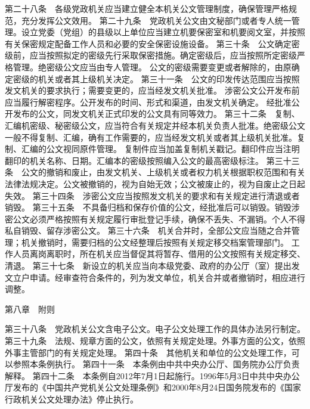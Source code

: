 \documentclass{gbt9704}
\begin{document}
第二十八条　各级党政机关应当建立健全本机关公文管理制度，确保管理严格规范，充分发挥公文效用。
第二十九条　党政机关公文由文秘部门或者专人统一管理。设立党委（党组）的县级以上单位应当建立机要保密室和机要阅文室，并按照有关保密规定配备工作人员和必要的安全保密设施设备。
第三十条　公文确定密级前，应当按照拟定的密级先行采取保密措施。确定密级后，应当按照所定密级严格管理。绝密级公文应当由专人管理。
公文的密级需要变更或者解除的，由原确定密级的机关或者其上级机关决定。
第三十一条　公文的印发传达范围应当按照发文机关的要求执行；需要变更的，应当经发文机关批准。
涉密公文公开发布前应当履行解密程序。公开发布的时间、形式和渠道，由发文机关确定。
经批准公开发布的公文，同发文机关正式印发的公文具有同等效力。
第三十二条　复制、汇编机密级、秘密级公文，应当符合有关规定并经本机关负责人批准。绝密级公文一般不得复制、汇编，确有工作需要的，应当经发文机关或者其上级机关批准。复制、汇编的公文视同原件管理。
复制件应当加盖复制机关戳记。翻印件应当注明翻印的机关名称、日期。汇编本的密级按照编入公文的最高密级标注。
第三十三条　公文的撤销和废止，由发文机关、上级机关或者权力机关根据职权范围和有关法律法规决定。公文被撤销的，视为自始无效；公文被废止的，视为自废止之日起失效。
第三十四条　涉密公文应当按照发文机关的要求和有关规定进行清退或者销毁。
第三十五条　不具备归档和保存价值的公文，经批准后可以销毁。销毁涉密公文必须严格按照有关规定履行审批登记手续，确保不丢失、不漏销。个人不得私自销毁、留存涉密公文。
第三十六条　机关合并时，全部公文应当随之合并管理；机关撤销时，需要归档的公文经整理后按照有关规定移交档案管理部门。
工作人员离岗离职时，所在机关应当督促其将暂存、借用的公文按照有关规定移交、清退。
第三十七条　新设立的机关应当向本级党委、政府的办公厅（室）提出发文立户申请。经审查符合条件的，列为发文单位，机关合并或者撤销时，相应进行调整。

第八章　附则

第三十八条　党政机关公文含电子公文。电子公文处理工作的具体办法另行制定。
第三十九条　法规、规章方面的公文，依照有关规定处理。外事方面的公文，依照外事主管部门的有关规定处理。
第四十条　其他机关和单位的公文处理工作，可以参照本条例执行。
第四十一条　本条例由中共中央办公厅、国务院办公厅负责解释。
第四十二条　本条例自2012年7月1日起施行。1996年5月3日中共中央办公厅发布的《中国共产党机关公文处理条例》和2000年8月24日国务院发布的《国家行政机关公文处理办法》停止执行。
\end{document}

